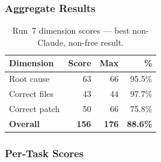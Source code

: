 \subsubsection{Aggregate Results}

\begin{table}[h]
\centering
\caption{Run~7 dimension scores --- best non-Claude, non-free result.}\label{tab:r7-dim}
\begin{tabular}{lrrr}
\toprule
\textbf{Dimension} & \textbf{Score} & \textbf{Max} & \textbf{\%} \\
\midrule
Root cause         & 63 & 66 & 95.5\% \\
Correct files      & 43 & 44 & 97.7\% \\
Correct patch      & 50 & 66 & 75.8\% \\
\midrule
\textbf{Overall}   & \textbf{156} & \textbf{176} & \textbf{88.6\%} \\
\bottomrule
\end{tabular}
\end{table}

\subsubsection{Per-Task Scores}

